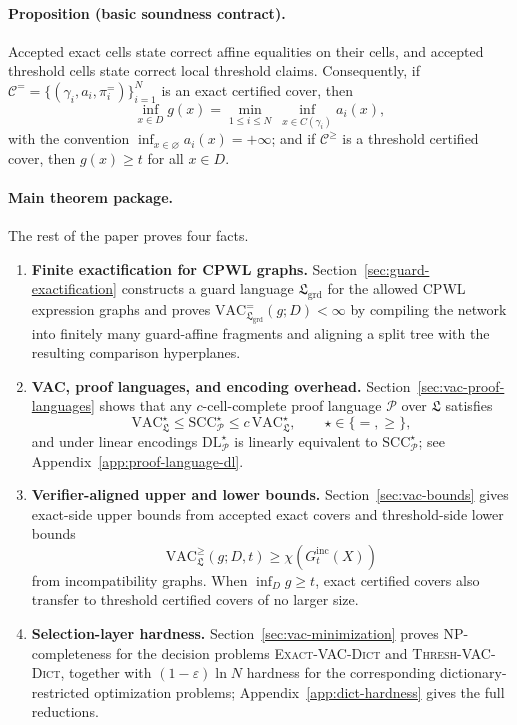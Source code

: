 \documentclass{article}
\begin{document}
\paragraph{Proposition (basic soundness contract).}
Accepted exact cells state correct affine equalities on their cells, and accepted threshold cells state correct local threshold claims. Consequently, if $\mathcal C^{=} = \{(\gamma_i,a_i,\pi_i^{=})\}_{i=1}^N$ is an exact certified cover, then
\[
\inf_{x\in D} g(x)= \min_{1\le i\le N}\ \inf_{x\in C(\gamma_i)} a_i(x),
\]
with the convention $\inf_{x\in\varnothing} a_i(x)=+\infty$; and if $\mathcal C^{\ge}$ is a threshold certified cover, then $g(x)\ge t$ for all $x\in D$.

\paragraph{Main theorem package.}
The rest of the paper proves four facts.
\begin{enumerate}
    \item \textbf{Finite exactification for CPWL graphs.} Section~\ref{sec:guard-exactification} constructs a guard language $\mathfrak L_{\mathrm{grd}}$ for the allowed CPWL expression graphs and proves $\mathrm{VAC}^{=}_{\mathfrak L_{\mathrm{grd}}}(g;D)<\infty$ by compiling the network into finitely many guard-affine fragments and aligning a split tree with the resulting comparison hyperplanes.

    \item \textbf{VAC, proof languages, and encoding overhead.} Section~\ref{sec:vac-proof-languages} shows that any $c$-cell-complete proof language $\mathcal P$ over $\mathfrak L$ satisfies
    \[
    \mathrm{VAC}^{\star}_{\mathfrak L} \le \mathrm{SCC}^{\star}_{\mathcal P} \le c\,\mathrm{VAC}^{\star}_{\mathfrak L},
    \qquad \star\in\{=,\ge\},
    \]
    and under linear encodings $\mathrm{DL}^{\star}_{\mathcal P}$ is linearly equivalent to $\mathrm{SCC}^{\star}_{\mathcal P}$; see Appendix~\ref{app:proof-language-dl}.

    \item \textbf{Verifier-aligned upper and lower bounds.} Section~\ref{sec:vac-bounds} gives exact-side upper bounds from accepted exact covers and threshold-side lower bounds
    \[
    \mathrm{VAC}^{\ge}_{\mathfrak L}(g;D,t)\ge \chi(G_t^{\mathrm{inc}}(X))
    \]
    from incompatibility graphs. When $\inf_D g\ge t$, exact certified covers also transfer to threshold certified covers of no larger size.

    \item \textbf{Selection-layer hardness.} Section~\ref{sec:vac-minimization} proves NP-completeness for the decision problems \textsc{Exact-VAC-Dict} and \textsc{Thresh-VAC-Dict}, together with $(1-\varepsilon)\ln N$ hardness for the corresponding dictionary-restricted optimization problems; Appendix~\ref{app:dict-hardness} gives the full reductions.
\end{enumerate}
\end{document}

